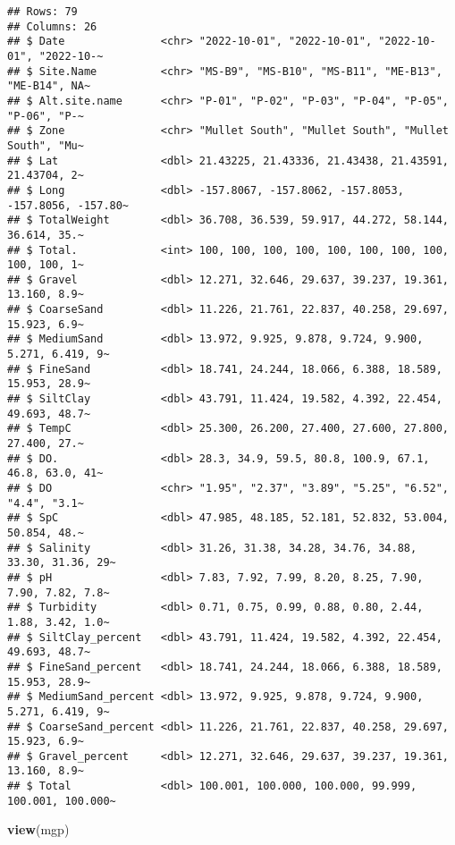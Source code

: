 \documentclass[
]{article}
\newenvironment{Shaded}{\begin{snugshade}}{\end{snugshade}}
\newcommand{\FunctionTok}[1]{\textcolor[rgb]{0.13,0.29,0.53}{\textbf{#1}}}
\newcommand{\NormalTok}[1]{#1}
\begin{document}
\begin{verbatim}
## Rows: 79
## Columns: 26
## $ Date               <chr> "2022-10-01", "2022-10-01", "2022-10-01", "2022-10-~
## $ Site.Name          <chr> "MS-B9", "MS-B10", "MS-B11", "ME-B13", "ME-B14", NA~
## $ Alt.site.name      <chr> "P-01", "P-02", "P-03", "P-04", "P-05", "P-06", "P-~
## $ Zone               <chr> "Mullet South", "Mullet South", "Mullet South", "Mu~
## $ Lat                <dbl> 21.43225, 21.43336, 21.43438, 21.43591, 21.43704, 2~
## $ Long               <dbl> -157.8067, -157.8062, -157.8053, -157.8056, -157.80~
## $ TotalWeight        <dbl> 36.708, 36.539, 59.917, 44.272, 58.144, 36.614, 35.~
## $ Total.             <int> 100, 100, 100, 100, 100, 100, 100, 100, 100, 100, 1~
## $ Gravel             <dbl> 12.271, 32.646, 29.637, 39.237, 19.361, 13.160, 8.9~
## $ CoarseSand         <dbl> 11.226, 21.761, 22.837, 40.258, 29.697, 15.923, 6.9~
## $ MediumSand         <dbl> 13.972, 9.925, 9.878, 9.724, 9.900, 5.271, 6.419, 9~
## $ FineSand           <dbl> 18.741, 24.244, 18.066, 6.388, 18.589, 15.953, 28.9~
## $ SiltClay           <dbl> 43.791, 11.424, 19.582, 4.392, 22.454, 49.693, 48.7~
## $ TempC              <dbl> 25.300, 26.200, 27.400, 27.600, 27.800, 27.400, 27.~
## $ DO.                <dbl> 28.3, 34.9, 59.5, 80.8, 100.9, 67.1, 46.8, 63.0, 41~
## $ DO                 <chr> "1.95", "2.37", "3.89", "5.25", "6.52", "4.4", "3.1~
## $ SpC                <dbl> 47.985, 48.185, 52.181, 52.832, 53.004, 50.854, 48.~
## $ Salinity           <dbl> 31.26, 31.38, 34.28, 34.76, 34.88, 33.30, 31.36, 29~
## $ pH                 <dbl> 7.83, 7.92, 7.99, 8.20, 8.25, 7.90, 7.90, 7.82, 7.8~
## $ Turbidity          <dbl> 0.71, 0.75, 0.99, 0.88, 0.80, 2.44, 1.88, 3.42, 1.0~
## $ SiltClay_percent   <dbl> 43.791, 11.424, 19.582, 4.392, 22.454, 49.693, 48.7~
## $ FineSand_percent   <dbl> 18.741, 24.244, 18.066, 6.388, 18.589, 15.953, 28.9~
## $ MediumSand_percent <dbl> 13.972, 9.925, 9.878, 9.724, 9.900, 5.271, 6.419, 9~
## $ CoarseSand_percent <dbl> 11.226, 21.761, 22.837, 40.258, 29.697, 15.923, 6.9~
## $ Gravel_percent     <dbl> 12.271, 32.646, 29.637, 39.237, 19.361, 13.160, 8.9~
## $ Total              <dbl> 100.001, 100.000, 100.000, 99.999, 100.001, 100.000~
\end{verbatim}

\begin{Shaded}
\begin{Highlighting}[]
\FunctionTok{view}\NormalTok{(mgp)}
\end{Highlighting}
\end{Shaded}
\end{document}
